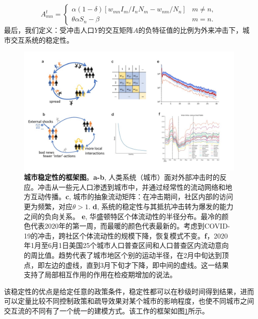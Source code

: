 \begin{equation}
    A^t_{m n}=\begin{cases}
\alpha(1-\delta)\left[ w_{m n} I_{m} / I_{n}N_{m} - w_{n m} / N_{n}\right] & m \neq n, \\
\theta \alpha S_{n}-\beta & m=n.
\end{cases}
\end{equation}最后，我们定义：受冲击人口$Y$的交互矩阵$A$的负特征值的比例为外来冲击下，城市交互系统的稳定性。\begin{figure}
    \centering
    \includegraphics[width = 0.9\linewidth]{Figs/Figure1.jpg}
    \caption{\textbf{城市稳定性的框架图}。\textbf{a-b}, 人类系统（城市）面对外部冲击时的反应。冲击从一些元人口渗透到城市中，并通过经常性的流动网络和地方互动传播。\textbf{c}, 城市的抽象流动矩阵：在冲击期间，社区内部的访问更为频繁，对应$\theta > 1$. \textbf{d}, 系统的稳定性与其抵抗冲击转为爆发的能力之间的负向关系。 \textbf{e}, 华盛顿特区个体流动性的半径分布。最冷的颜色代表2020年的第一周，而最暖的颜色代表最新的。考虑到COVID-19的冲击，跨社区个体流动性的规模下降，恢复模式不变。\textbf{f}，2020年1月至6月1日美国25个城市人口普查区间和人口普查区内流动意向的周比值。趋势代表了城市地区个别的运动半径，在2月中旬达到顶点，即左边的虚线，直到3月下旬才下降，即中间的虚线。这一结果支持了局部相互作用的作用在检疫期增加的说法。}
    \label{fig:allee1}
\end{figure} 该稳定性的优点是给定任意的政策条件，稳定性都可以在秒级时间得到结果，进而可以定量比较不同控制政策和疏导效果对某个城市的影响程度，也使不同城市之间交互流的不同有了一个统一的建模方式。该工作的框架如图\ref{fig:allee1}所示。

